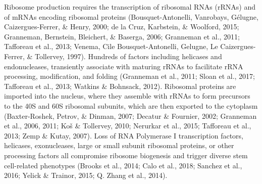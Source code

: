 \documentclass[12pt,oneside]{reedthesis}
\begin{document}
Ribosome production requires the transcription of ribosomal RNAs (rRNAs) and of mRNAs encoding ribosomal proteins (Bousquet-Antonelli, Vanrobays, Gélugne, Caizergues-Ferrer, \& Henry, 2000; de la Cruz, Karbstein, \& Woolford, 2015; Granneman, Bernstein, Bleichert, \& Baserga, 2006; Granneman et al., 2011; Tafforeau et al., 2013; Venema, Cile Bousquet-Antonelli, Gelugne, Le Caizergues-Ferrer, \& Tollervey, 1997). Hundreds of factors including helicases and endonucleases, transiently associate with maturing rRNAs to facilitate rRNA processing, modification, and folding (Granneman et al., 2011; Sloan et al., 2017; Tafforeau et al., 2013; Watkins \& Bohnsack, 2012). Ribosomal proteins are imported into the nucleus, where they assemble with rRNAs to form precursors to the 40S and 60S ribosomal subunits, which are then exported to the cytoplasm (Baxter-Roshek, Petrov, \& Dinman, 2007; Decatur \& Fournier, 2002; Granneman et al., 2006, 2011; Koš \& Tollervey, 2010; Nerurkar et al., 2015; Tafforeau et al., 2013; Zemp \& Kutay, 2007). Loss of RNA Polymerase I transcription factors, helicases, exonucleases, large or small subunit ribosomal proteins, or other processing factors all compromise ribosome biogenesis and trigger diverse stem cell-related phenotypes (Brooks et al., 2014; Calo et al., 2018; Sanchez et al., 2016; Yelick \& Trainor, 2015; Q. Zhang et al., 2014).
\end{document}
